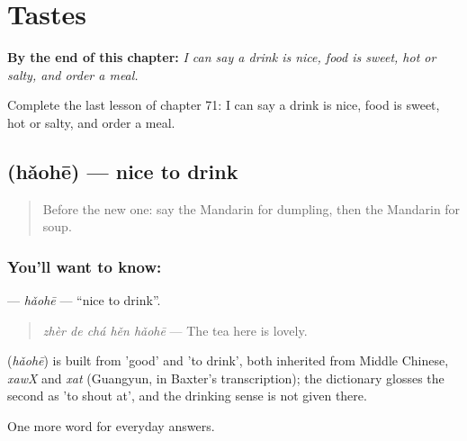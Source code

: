 
\chapter{Tastes}
\label{ch:zh-tastes}

\begin{chapteropening}
\textbf{By the end of this chapter:} \emph{I can say a drink is nice, food is sweet, hot or salty, and order a meal.}

Complete the last lesson of chapter 71: I can say a drink is nice, food is sweet, hot or salty, and order a meal.
\end{chapteropening}

\section[\texorpdfstring{\zh{好喝} (hǎohē)}{好喝 (hǎohē)}]{ (hǎohē) — nice to drink}

\label{lesson:ZH-C71-haohe}



\begin{quote}
Before the new one: say the Mandarin for dumpling, then the Mandarin for soup.
\end{quote}

\subsection*{You'll want to know: }
\textbf{} — \emph{hǎohē} — \textquotedblleft{}nice to drink\textquotedblright{}.

\begin{quote}
\emph{zhèr de chá hěn hǎohē} — The tea here is lovely.
\end{quote}

\begin{cousinweb}
\textbf{} (\emph{hǎohē}) is built from  'good' and  'to drink', both inherited from Middle Chinese, \emph{xawX} and \emph{xat} (Guangyun, in Baxter's transcription); the dictionary glosses the second as 'to shout at', and the drinking sense is not given there.
\end{cousinweb}

\begin{grammarlens}[title={What you've built}]
One more word for everyday answers.
\end{grammarlens}

